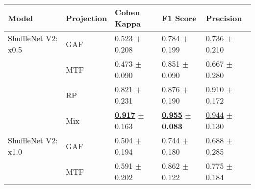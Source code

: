 
\begin{tabular}{lllll}
\toprule
Model & Projection & Cohen Kappa & F1 Score & Precision \\
\midrule
ShuffleNet V2: x0.5 & GAF & \textcolor[rgb]{0.8873720137,0.1126279863,0}{0.523} $\pm$ \textcolor[rgb]{0.8343759381,0.1656240619,0}{0.208} & \textcolor[rgb]{0.6687402799,0.3312597201,0}{0.784} $\pm$ \textcolor[rgb]{0.7892330506,0.2107669494,0}{0.199} & \textcolor[rgb]{0.6673189824,0.3326810176,0}{0.736} $\pm$ \textcolor[rgb]{0.3897371717,0.5000000000,0}{0.210} \\
 & MTF & \textcolor[rgb]{1.0000000000,0.0000000000,0}{0.473} $\pm$ \textcolor[rgb]{0.3631919561,0.5000000000,0}{0.090} & \textcolor[rgb]{0.4059097978,0.5000000000,0}{0.851} $\pm$ \textcolor[rgb]{0.0459000684,0.5000000000,0}{0.090} & \textcolor[rgb]{0.8825831703,0.1174168297,0}{0.667} $\pm$ \textcolor[rgb]{0.6766436317,0.3233563683,0}{0.280} \\
 & RP & \textcolor[rgb]{0.2158703072,0.5000000000,0}{0.821} $\pm$ \textcolor[rgb]{0.9277733337,0.0722266663,0}{0.231} & \textcolor[rgb]{0.3079315708,0.5000000000,0}{0.876} $\pm$ \textcolor[rgb]{0.7294240912,0.2705759088,0}{0.190} & \underline{\textcolor[rgb]{0.1291585127,0.5000000000,0}{0.910}} $\pm$ \textcolor[rgb]{0.2351015167,0.5000000000,0}{0.172} \\
 & Mix & \underline{\textbf{\textcolor[rgb]{0.0000000000,0.5000000000,0}{0.917}}} $\pm$ \textcolor[rgb]{0.6538202475,0.3461797525,0}{0.163} & \underline{\textbf{\textcolor[rgb]{0.0000000000,0.5000000000,0}{0.955}}} $\pm$ \textbf{\textcolor[rgb]{0.0000000000,0.5000000000,0}{0.083}} & \underline{\textcolor[rgb]{0.0215264188,0.5000000000,0}{0.944}} $\pm$ \textcolor[rgb]{0.0609939296,0.5000000000,0}{0.130} \\
ShuffleNet V2: x1.0 & GAF & \textcolor[rgb]{0.9291808874,0.0708191126,0}{0.504} $\pm$ \textcolor[rgb]{0.7773511492,0.2226488508,0}{0.194} & \textcolor[rgb]{0.8253923371,0.1746076629,0}{0.744} $\pm$ \textcolor[rgb]{0.6641345574,0.3358654426,0}{0.180} & \textcolor[rgb]{0.8180039139,0.1819960861,0}{0.688} $\pm$ \textcolor[rgb]{0.6973487950,0.3026512050,0}{0.285} \\
 & MTF & \textcolor[rgb]{0.7337883959,0.2662116041,0}{0.591} $\pm$ \textcolor[rgb]{0.8121219026,0.1878780974,0}{0.202} & \textcolor[rgb]{0.3639191291,0.5000000000,0}{0.862} $\pm$ \textcolor[rgb]{0.2646008883,0.5000000000,0}{0.122} & \textcolor[rgb]{0.5467710372,0.4532289628,0}{0.775} $\pm$ \textcolor[rgb]{0.2859299411,0.5000000000,0}{0.184} \\

\end{tabular}
